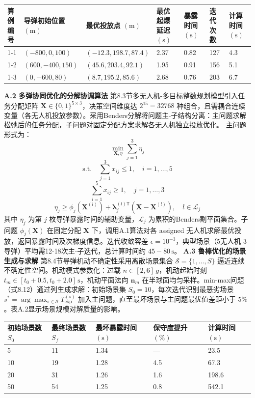 \documentclass{JXUSTmodeling}
\begin{document}
\begin{appendixx}
\begin{table}[htbp]
  \centering
  \begin{tabularx}{\textwidth}{YYYYYYY}
    \toprule
    算例编号 & 导弹初始位置 $(\text{m})$ & 最优投放点 $(\text{m})$ & 最优起爆延迟 $(\text{s})$ & 暴露时间 $(\text{s})$ & 迭代次数 & 计算时间 $(\text{s})$ \\
    -1 & $(-800,0,100)$ & $(-12.3,198.7,87.4)$ & 2.37 & 0.82 & 127 & 4.3 \\
    1-2 & $(600,-400,150)$ & $(45.6,203.4,92.1)$ & 1.95 & 0.91 & 156 & 5.1 \\
    1-3 & $(0,-600,80)$ & $(8.7,195.2,85.6)$ & 2.68 & 0.76 & 203 & 6.7 \\
    \bottomrule
  \end{tabularx}
\end{table}

\textbf{A.2 多弹协同优化的分解协调算法}
第8.3节多无人机-多目标整数规划模型引入任务分配矩阵 $\mathbf{X}\in\{0,1\}^{5\times 3}$，决策空间维度达 $2^{15}=32768$ 种组合，且需耦合连续变量（各无人机投放参数）。采用Benders分解将问题主-子结构分离：主问题求解松弛后的任务分配，子问题对固定分配方案求解各无人机独立投放优化。
主问题形式为：
\begin{equation}
\min_{\mathbf{X},\eta}\sum_{j=1}^{3}\eta_j \tag{A.3}
\end{equation}
$$\text{s.t.}\quad \sum_{j=1}^{3}x_{ij}\leq 1,\quad i=1,\ldots,5$$
$$\sum_{i=1}^{5}x_{ij}\geq 1,\quad j=1,\ldots,3$$
$$\eta_j\geq \phi_j(\mathbf{X}^{(l)})+\boldsymbol{\lambda}_j^{(l)\mathsf{T}}(\mathbf{X}-\mathbf{X}^{(l)}),\quad l\in\mathcal{L}_j$$
其中 $\eta_j$ 为第 $j$ 枚导弹暴露时间的辅助变量，$\mathcal{L}_j$ 为累积的Benders割平面集合。子问题 $\phi_j(\mathbf{X})$ 在固定分配 $\mathbf{X}$ 下，调用A.1算法对各 assigned 无人机求解最优投放，返回暴露时间及次梯度信息。迭代收敛容差 $\epsilon=10^{-3}$，典型场景（5无人机-3导弹）平均需12-18次主-子迭代，总计算时间约 $45-80\,\text{s}$。
\textbf{A.3 鲁棒优化的场景生成与求解}
第8.4节导弹机动不确定性采用离散场景集合 $\mathcal{S}=\{1,\ldots,S\}$ 逼近连续不确定性空间。机动模式参数化：过载 $n\in[2,6]\,g$，机动起始时刻 $t_m\in[t_0+0.5,t_0+2.0]\,\text{s}$，机动平面法向 $\hat{\mathbf{n}}_m$ 在半球面均匀采样。min-max问题（式8.12）通过列生成求解：初始场景集 $S_0=10$，每次迭代识别最恶劣场景 $s^*=\arg\max_{s\in\mathcal{S}} T_{\text{exp}}^{(s)}$ 加入主问题，直至最坏场景与主问题最优值差距小于 $5\%$。表A.2显示场景规模对解质量的影响。
\begin{table}[htbp]
  \centering
  \begin{tabularx}{\textwidth}{YYYYY}
    \toprule
    初始场景数 $S_0$ & 最终场景数 $S_f$ & 最坏暴露时间 $(\text{s})$ & 保守度提升 $(\%)$ & 计算时间 $(\text{s})$ \\
     & 11 & 1.34 & — & 23.5 \\
    10 & 19 & 1.28 & 4.5 & 67.3 \\
    20 & 31 & 1.26 & 1.6 & 198.6 \\
    50 & 54 & 1.25 & 0.8 & 542.1 \\
    \bottomrule
  \end{tabularx}
\end{table}


\end{appendixx}
\end{document}
